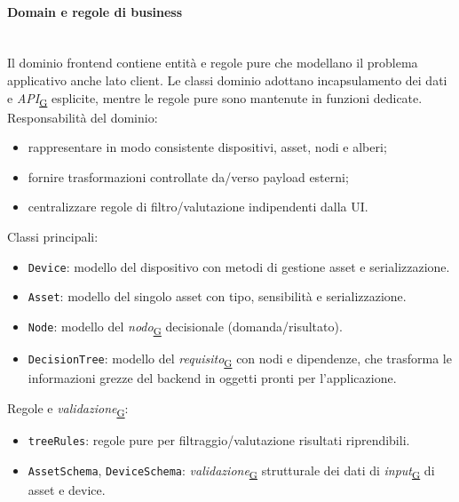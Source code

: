 \documentclass[a4paper,12pt]{article}
\begin{document}
            \paragraph{Domain e regole di business}\mbox{}\\
                Il dominio frontend contiene entità e regole pure che modellano il problema applicativo anche lato client. Le classi dominio adottano incapsulamento dei dati e \textit{API}\textsubscript{\href{https://atlasteam9.github.io/Atlas/glossario.html\#API}{G}} esplicite, mentre le regole pure sono mantenute in funzioni dedicate. \\
                Responsabilità del dominio:
                \begin{itemize}
                    \item rappresentare in modo consistente dispositivi, asset, nodi e alberi;
                    \item fornire trasformazioni controllate da/verso payload esterni;
                    \item centralizzare regole di filtro/valutazione indipendenti dalla UI.
                \end{itemize}
                Classi principali:
                \begin{itemize}
                    \item \texttt{Device}: modello del dispositivo con metodi di gestione asset e serializzazione.
                    \item \texttt{Asset}: modello del singolo asset con tipo, sensibilità e serializzazione.
                    \item \texttt{Node}: modello del \textit{nodo}\textsubscript{\href{https://atlasteam9.github.io/Atlas/glossario.html\#Nodo}{G}} decisionale (domanda/risultato).
                    \item \texttt{DecisionTree}: modello del \textit{requisito}\textsubscript{\href{https://atlasteam9.github.io/Atlas/glossario.html\#Requisito}{G}} con nodi e dipendenze, che trasforma le informazioni grezze del backend in oggetti pronti per l'applicazione.
                \end{itemize}
                
                Regole e \textit{validazione}\textsubscript{\href{https://atlasteam9.github.io/Atlas/glossario.html\#Validazione}{G}}:
                \begin{itemize}
                    \item \texttt{treeRules}: regole pure per filtraggio/valutazione risultati riprendibili.
                    \item \texttt{AssetSchema}, \texttt{DeviceSchema}: \textit{validazione}\textsubscript{\href{https://atlasteam9.github.io/Atlas/glossario.html\#Validazione}{G}} strutturale dei dati di \textit{input}\textsubscript{\href{https://atlasteam9.github.io/Atlas/glossario.html\#Input}{G}} di asset e device.
                \end{itemize}
        
\end{document}
